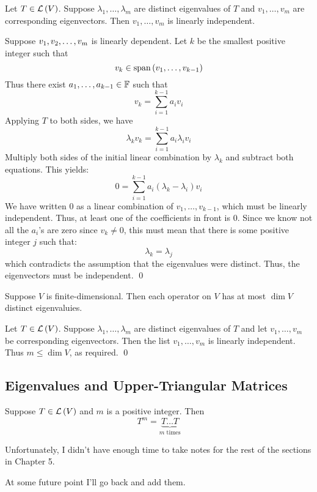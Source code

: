 \begin{theorem} 
    Let $T \in \mathcal{L} \left( V \right)$. Suppose $\lambda_1, \dots, \lambda_m$ are distinct eigenvalues of $T$ and $v_1, \dots, v_m$
    are corresponding eigenvectors. Then $v_1, \dots, v_m$ is linearly independent.

    \begin{proof*}
        Suppose $v_1, v_2, \ldots, v_{m}$ is linearly dependent. Let $k$ be the smallest positive integer
        such that
        \[ v_k \in \operatorname{span}{(v_1, \dots, v_{k-1})} \]
        Thus there exist $a_1, \dots, a_{k-1} \in \operatorname{\mathbb{F}}$ such that
        \[ v_k = \sum_{i=1}^{k-1} a_i v_i \]
        Applying $T$ to both sides, we have
        \[ \lambda_k v_k = \sum_{i=1}^{k-1} a_i \lambda_i v_i \]
        Multiply both sides of the initial linear combination by $\lambda_k$ and subtract both equations.
        This yields:
        \[ 0 = \sum_{i=1}^{k-1} a_i (\lambda_k - \lambda_i) v_i \]
        We have written 0 as a linear combination of $v_1, \dots, v_{k-1}$, which must be linearly independent.
        Thus, at least one of the coefficients in front is 0. Since we know not all the $a_i$'s are zero since $v_k \neq 0$,
        this must mean that there is some positive integer $j$ such that:
        \[ \lambda_k = \lambda_j \]
        which contradicts the assumption that the eigenvalues were distinct. Thus, the eigenvectors must be
        independent. \qed
    \end{proof*}
\end{theorem}

\begin{theorem} 
    Suppose $V$ is finite-dimensional. Then each operator on $V$ has at most $\dim V$ distinct eigenvaluies.

    \begin{proof*}
        Let $T \in \mathcal{L} \left( V \right)$. Suppose $\lambda_1, \dots, \lambda_m$ are distinct eigenvalues of $T$ and let
        $v_1, \dots, v_m$ be corresponding eigenvectors. Then the list $v_1, \dots, v_m$ is linearly independent.
        Thus $m \leq \dim V$, as required. \qed
    \end{proof*}
\end{theorem}

\subsection{Eigenvalues and Upper-Triangular Matrices}

\begin{definition} 
    Suppose $T \in \mathcal{L} \left( V \right)$ and $m$ is a positive integer. Then
    \[ T^m = \underbrace{T \dots T}_{m \text{ times}} \]
\end{definition}

Unfortunately, I didn't have enough time to take notes for the rest of the sections in Chapter 5.

At some future point I'll go back and add them.

\endinput